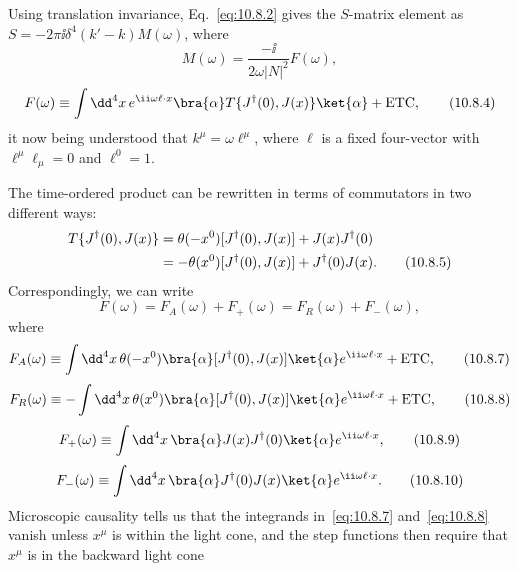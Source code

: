 Using translation invariance, Eq.~\eqref{eq:10.8.2} gives the $S$-matrix
element as $S=-2\pi \ii\delta^4(k'-k)M(\omega)$, where
\begin{equation}
  M(\omega)=\frac{-\ii}{2\omega|N|^2}F(\omega),
  \tag{10.8.3}\label{eq:10.8.3}
\end{equation}
\begin{equation}
  F(\omega)\equiv\int \dd^4x\,e^{\ii\omega\ell\cdot x}
  \bra{\alpha}T\{J^\dagger(0),J(x)\}\ket{\alpha}+\mathrm{ETC},
  \tag{10.8.4}\label{eq:10.8.4}
\end{equation}
it now being understood that $k^\mu=\omega\ell^\mu$, where $\ell$ is a
fixed four-vector with $\ell^\mu\ell_\mu=0$ and $\ell^0=1$.

The time-ordered product can be rewritten in terms of commutators in two
different ways:
\begin{align}
  T\{J^\dagger(0),J(x)\}
  &=\theta(-x^0)[J^\dagger(0),J(x)]+J(x)J^\dagger(0)\notag\\
  &=-\theta(x^0)[J^\dagger(0),J(x)]+J^\dagger(0)J(x).
  \tag{10.8.5}\label{eq:10.8.5}
\end{align}
Correspondingly, we can write
\begin{equation}
  F(\omega)=F_A(\omega)+F_+(\omega)=F_R(\omega)+F_-(\omega),
  \tag{10.8.6}\label{eq:10.8.6}
\end{equation}
where
\begin{equation}
  F_A(\omega)\equiv\int \dd^4x\,\theta(-x^0)
  \bra{\alpha}[J^\dagger(0),J(x)]\ket{\alpha}
  e^{\ii\omega\ell\cdot x}+\mathrm{ETC},
  \tag{10.8.7}\label{eq:10.8.7}
\end{equation}
\begin{equation}
  F_R(\omega)\equiv-\int \dd^4x\,\theta(x^0)
  \bra{\alpha}[J^\dagger(0),J(x)]\ket{\alpha}
  e^{\ii\omega\ell\cdot x}+\mathrm{ETC},
  \tag{10.8.8}\label{eq:10.8.8}
\end{equation}
\begin{equation}
  F_+(\omega)\equiv\int \dd^4x\,
  \bra{\alpha}J(x)J^\dagger(0)\ket{\alpha}e^{\ii\omega\ell\cdot x},
  \tag{10.8.9}\label{eq:10.8.9}
\end{equation}
\begin{equation}
  F_-(\omega)\equiv\int \dd^4x\,
  \bra{\alpha}J^\dagger(0)J(x)\ket{\alpha}e^{\ii\omega\ell\cdot x}.
  \tag{10.8.10}\label{eq:10.8.10}
\end{equation}
Microscopic causality tells us that the integrands in~\eqref{eq:10.8.7}
and~\eqref{eq:10.8.8} vanish unless $x^\mu$ is within the light cone, and
the step functions then require that $x^\mu$ is in the backward light cone
